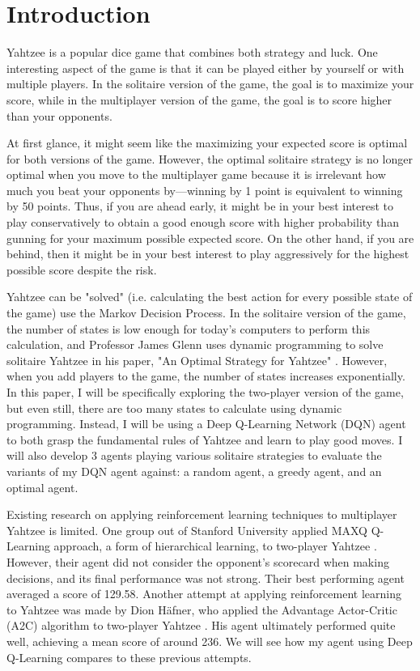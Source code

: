 \documentclass[12pt]{article}
\begin{document}
\tableofcontents

\newpage
\section{Introduction}
Yahtzee is a popular dice game that combines both strategy and luck. One interesting aspect of the game is that it can be played either by yourself or with multiple players. In the solitaire version of the game, the goal is to maximize your score, while in the multiplayer version of the game, the goal is to score higher than your opponents.

At first glance, it might seem like the maximizing your expected score is optimal for both versions of the game. However, the optimal solitaire strategy is no longer optimal when you move to the multiplayer game because it is irrelevant how much you beat your opponents by—winning by 1 point is equivalent to winning by 50 points. Thus, if you are ahead early, it might be in your best interest to play conservatively to obtain a good enough score with higher probability than gunning for your maximum possible expected score. On the other hand, if you are behind, then it might be in your best interest to play aggressively for the highest possible score despite the risk.

Yahtzee can be "solved" (i.e. calculating the best action for every possible state of the game) use the Markov Decision Process. In the solitaire version of the game, the number of states is low enough for today's computers to perform this calculation, and Professor James Glenn uses dynamic programming to solve solitaire Yahtzee in his paper, "An Optimal Strategy for Yahtzee" \cite{glenn}. However, when you add players to the game, the number of states increases exponentially. In this paper, I will be specifically exploring the two-player version of the game, but even still, there are too many states to calculate using dynamic programming. Instead, I will be using a Deep Q-Learning Network (DQN) agent to both grasp the fundamental rules of Yahtzee and learn to play good moves. I will also develop 3 agents playing various solitaire strategies to evaluate the variants of my DQN agent against: a random agent, a greedy agent, and an optimal agent.

Existing research on applying reinforcement learning techniques to multiplayer Yahtzee is limited. One group out of Stanford University applied MAXQ Q-Learning approach, a form of hierarchical learning, to two-player Yahtzee \cite{kang}. However, their agent did not consider the opponent's scorecard when making decisions, and its final performance was not strong. Their best performing agent averaged a score of 129.58. Another attempt at applying reinforcement learning to Yahtzee was made by Dion Häfner, who applied the Advantage Actor-Critic (A2C) algorithm to two-player Yahtzee \cite{hafner}. His agent ultimately performed quite well, achieving a mean score of around 236. We will see how my agent using Deep Q-Learning compares to these previous attempts.
\end{document}
